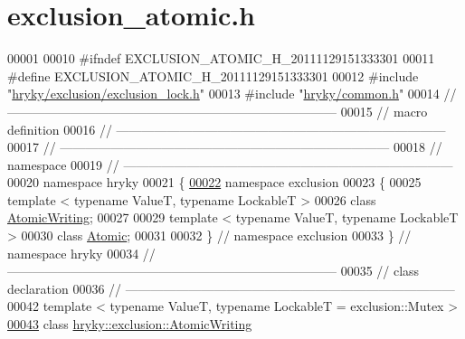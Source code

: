 \hypertarget{exclusion__atomic_8h_source}{\section{exclusion\-\_\-atomic.\-h}
}

\begin{DoxyCode}
00001 
00010 \textcolor{preprocessor}{#ifndef EXCLUSION\_ATOMIC\_H\_20111129151333301}
00011 \textcolor{preprocessor}{}\textcolor{preprocessor}{#define EXCLUSION\_ATOMIC\_H\_20111129151333301}
00012 \textcolor{preprocessor}{}\textcolor{preprocessor}{#include "\hyperlink{exclusion__lock_8h}{hryky/exclusion/exclusion_lock.h}"}
00013 \textcolor{preprocessor}{#include "\hyperlink{common_8h}{hryky/common.h}"}
00014 \textcolor{comment}{//
      ------------------------------------------------------------------------------}
00015 \textcolor{comment}{// macro definition}
00016 \textcolor{comment}{//
      ------------------------------------------------------------------------------}
00017 \textcolor{comment}{//
      ------------------------------------------------------------------------------}
00018 \textcolor{comment}{// namespace}
00019 \textcolor{comment}{//
      ------------------------------------------------------------------------------}
00020 \textcolor{keyword}{namespace }hryky
00021 \{
\hypertarget{exclusion__atomic_8h_source_l00022}{}\hyperlink{namespacehryky_1_1exclusion}{00022} \textcolor{keyword}{namespace }exclusion
00023 \{
00025     \textcolor{keyword}{template} < \textcolor{keyword}{typename} ValueT, \textcolor{keyword}{typename} LockableT >
00026     \textcolor{keyword}{class }\hyperlink{classhryky_1_1exclusion_1_1_atomic_writing}{AtomicWriting};
00027     
00029     \textcolor{keyword}{template} < \textcolor{keyword}{typename} ValueT, \textcolor{keyword}{typename} LockableT >
00030     \textcolor{keyword}{class }\hyperlink{classhryky_1_1exclusion_1_1_atomic}{Atomic};
00031     
00032 \} \textcolor{comment}{// namespace exclusion}
00033 \} \textcolor{comment}{// namespace hryky}
00034 \textcolor{comment}{//
      ------------------------------------------------------------------------------}
00035 \textcolor{comment}{// class declaration}
00036 \textcolor{comment}{//
      ------------------------------------------------------------------------------}
00042 \textcolor{comment}{}\textcolor{keyword}{template} < \textcolor{keyword}{typename} ValueT, \textcolor{keyword}{typename} LockableT = exclusion::Mutex >
\hypertarget{exclusion__atomic_8h_source_l00043}{}\hyperlink{classhryky_1_1exclusion_1_1_atomic_writing}{00043} \textcolor{keyword}{class }\hyperlink{classhryky_1_1exclusion_1_1_atomic_writing}{hryky::exclusion::AtomicWriting}

\end{DoxyCode}
